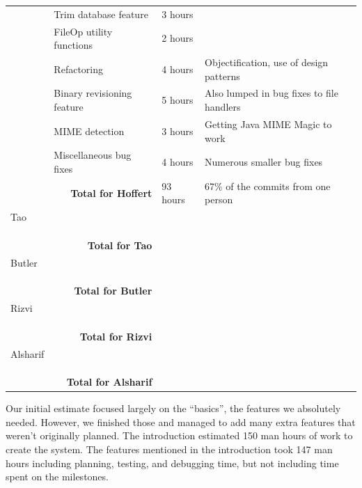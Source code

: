 \documentclass[12pt,a4paper]{article}
\begin{document}
\begin{longtable}{| p{2cm} | p{5cm} | p{3cm}| p{4.5cm} |}
   & Trim database feature & 3 hours & \\ \cline{2-4}
   & FileOp utility functions & 2 hours & \\ \cline{2-4}
   & Refactoring & 4 hours & Objectification, use of design patterns \\ \cline{2-4}
   & Binary revisioning feature & 5 hours & Also lumped in bug fixes to file handlers \\ \cline{2-4}
   & MIME detection & 3 hours & Getting Java MIME Magic to work\\ \cline{2-4}
   & Miscellaneous bug fixes & 4 hours & Numerous smaller bug fixes\\ \hline
  \multicolumn{2}{|r|}{\textbf{Total for Hoffert}} & 93 hours & 67\% of the commits from one person\\ \hline \hline
  Tao &  &  & \\ \cline{2-4}
   &  &  & \\ \cline{2-4}
   &  &  & \\ \cline{2-4}
   &  &  & \\ \hline
  \multicolumn{2}{|r|}{\textbf{Total for Tao}}  &  & \\ \hline \hline
  Butler &  &  & \\ \cline{2-4}
   &  &  & \\ \cline{2-4}
   &  &  & \\ \cline{2-4}
   &  &  & \\ \hline
  \multicolumn{2}{|r|}{\textbf{Total for Butler}}  &  & \\ \hline \hline
  Rizvi &  &  & \\ \cline{2-4}
   &  &  & \\ \cline{2-4}
   &  &  & \\ \cline{2-4}
   &  &  & \\ \hline
  \multicolumn{2}{|r|}{\textbf{Total for Rizvi}}  &  & \\ \hline \hline
  Alsharif &  &  & \\ \cline{2-4}
   &  &  & \\ \cline{2-4}
   &  &  & \\ \cline{2-4}
   &  &  & \\ \hline
  \multicolumn{2}{|r|}{\textbf{Total for Alsharif}}  &  & \\ \hline
\end{longtable}

Our initial estimate focused largely on the ``basics'', the features we absolutely needed. However, we finished those and managed to add many extra features that weren't originally planned. The introduction estimated 150 man hours of work to create the system. The features mentioned in the introduction took 147 man hours including planning, testing, and debugging time, but not including time spent on the milestones.
\end{document}
